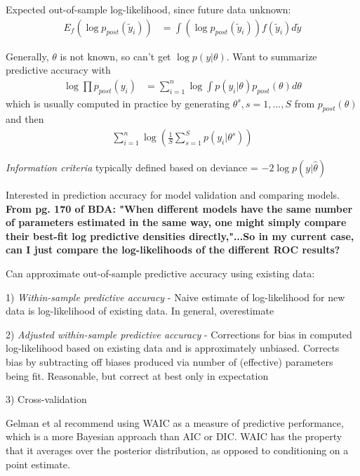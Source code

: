 \documentclass[11pt]{labbook}
\begin{document}
Expected out-of-sample log-likelihood, since future data unknown:
\begin{align*}
E_f(\log{p_{post}(\tilde{y}_i)}) &= \int(\log{p_{post}(\tilde{y}_i)})f(\tilde{y}_i)d\tilde{y}
\end{align*}

Generally, $\theta$ is not known, so can't get $\log{p(y|\theta)}$. Want to summarize predictive accuracy with
\begin{align*}
\log{\prod p_{post}(y_i)} &= \sum_{i=1}^n \log{\int p(y_i|\theta)p_{post}(\theta)d\theta}
\end{align*} 
which is usually computed in practice by generating $\theta^s, s = 1,...,S$ from $p_{post}(\theta)$ and then
\begin{align*}
\sum_{i=1}^n \log{\left(\frac{1}{S} \sum_{s=1}^S p(y_i|\theta^s)\right)}
\end{align*}


\textit{Information criteria} typically defined based on deviance = $-2\log{p(y|\hat{\theta})}$ 

Interested in prediction accuracy for model validation and comparing models. \textbf{From pg. 170 of BDA: "When different models have the same number of parameters estimated in the same way, one might simply compare their best-fit log predictive densities directly,"...So in my current case, can I just compare the log-likelihoods of the different ROC results?}

Can approximate out-of-sample predictive accuracy using existing data:

1) \textit{Within-sample predictive accuracy} - Naive estimate of log-likelihood for new data is log-likelihood of existing data. In general, overestimate

2) \textit{Adjusted within-sample predictive accuracy} - Corrections for bias in computed log-likelihood based on existing data and is approximately unbiased. Corrects bias by subtracting off biases produced via number of (effective) parameters being fit. Reasonable, but correct at best only in expectation

3) Cross-validation


Gelman et al recommend using WAIC as a measure of predictive performance, which is a more Bayesian approach than AIC or DIC. WAIC has the property that it averages over the posterior distribution, as opposed to conditioning on a point estimate. 
\end{document}
